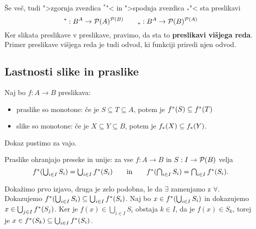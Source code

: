 Še več, tudi ">zgornja zvezdica $^{*}$"< in ">spodnja zvezdica $_{*}$"< sta preslikavi
%
\begin{equation*}
  {}^* : B^A \to \mathcal{P}(A)^{\mathcal{P}(B)} \qquad
  {}_* : B^A \to \mathcal{P}(B)^{\mathcal{P}(A)}
\end{equation*}
%
Ker slikata preslikave v preslikave, pravimo, da sta to \textbf{preslikavi višjega reda}. Primer preslikave višjega reda je tudi odvod, ki funkciji priredi njen odvod.


\subsection{Lastnosti slike in praslike}

\begin{izrek}
  Naj bo $f : A \to B$ preslikava:
  \begin{itemize}
  \item praslike so monotone: če je $S \subseteq T \subseteq A$, potem je $f^{*}(S) \subseteq f^{*}(T)$
  \item slike so monotone: če je $X \subseteq Y \subseteq B$, potem je $f_{*}(X) \subseteq f_{*}(Y)$.
  \end{itemize}
\end{izrek}

\begin{dokaz}
  Dokaz pustimo za vajo.
\end{dokaz}

\begin{izrek}
  Praslike ohranjajo preseke in unije: za vse $f : A \to B$ in $S : I \to \mathcal{P}(B)$ velja
  \begin{equation*}
    \textstyle
    f^{*} (\bigcup_{i \in I} S_i) = \bigcup_{i \in I} f^{*}(S_i)
    \qquad\text{in}\qquad
    f^{*} (\bigcap_{i \in I} S_i) = \bigcap_{i \in I} f^{*}(S_i).
  \end{equation*}
\end{izrek}

\begin{dokaz}
  Dokažimo prvo izjavo, druga je zelo podobna, le da $\exists$ zamenjamo z $\forall$.
  Dokazujemo $f^{*} (\bigcup_{i \in I} S_i) \subseteq \bigcup_{i \in I} f^{*}(S_i)$.
  Naj bo $x \in f^{*} (\bigcup_{i \in I} S_i)$ in dokazujemo $x \in \bigcup_{j \in I} f^{*}(S_j)$.
  Ker je $f(x) \in \bigcup_{i \in I} S_i$ obstaja $k \in I$, da je $f(x) \in S_k$, torej je
  $x \in f^{*}(S_k) \subseteq \bigcup_{i \in I} f^{*}(S_i)$.
\end{dokaz}

